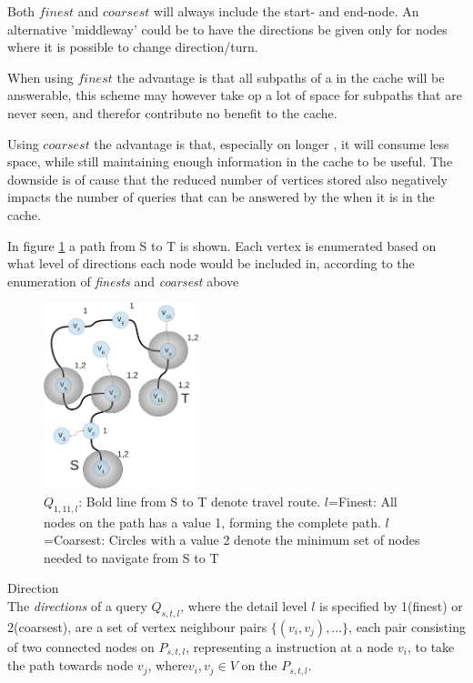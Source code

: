Both $finest$ and $coarsest$ will always include the start- and end-node. An alternative 'middleway' could be to have the directions be given only for nodes where it is possible to change direction/turn. 

When using $finest$ the advantage is that all subpaths of a \spath in the cache will be answerable, this scheme may however take op a lot of space for subpaths that are never seen, and therefor contribute no benefit to the cache.

Using $coarsest$ the advantage is that, especially on longer \spathsns, it will consume less space, while still maintaining enough information in the cache to be useful. The downside is of cause that the reduced number of vertices stored also negatively impacts the number of queries that can be answered by the \spath when it is in the cache.

In figure \ref{fig:minroute} a path from S to T is shown. Each vertex is enumerated based on what level of directions each node would be included in, according to the enumeration of \textit{finests} and \textit{coarsest} above


\begin{figure}[hbt]
  \center
        \includegraphics[width=0.4\textwidth]{figures/minroute}
        \caption{$Q_{1,11,l}$: Bold line from S to T denote travel route. $l$=Finest: All nodes on the path has a value 1, forming the complete path. 
        $l$=Coarsest: Circles with a value 2 denote the minimum set of nodes needed to navigate from S to T}
  \label{fig:minroute}
\end{figure}


\begin{definition}\label{def:direction} {Direction}\\
The \textit{directions} of a query $Q_{s,t,l}$, where the detail level $l$ is specified by 1(finest) or 2(coarsest), are a set of vertex neighbour pairs $\{(v_i,v_j),...\}$, each pair consisting of two connected nodes on $P_{s,t,l}$, representing a instruction at a node $v_i$, to take the path towards node $v_j$, where$v_i,v_j \in V$ on the \spath $P_{s,t,l}$.
\end{definition}


